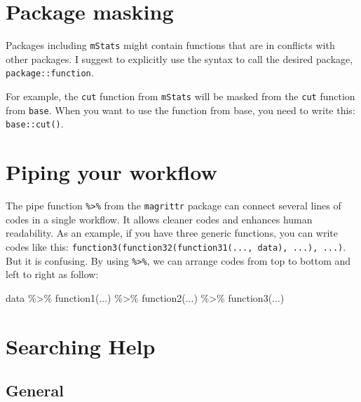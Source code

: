 \documentclass[
]{book}
\newenvironment{Shaded}{\begin{snugshade}}{\end{snugshade}}
\newcommand{\FunctionTok}[1]{\textcolor[rgb]{0.00,0.00,0.00}{#1}}
\newcommand{\NormalTok}[1]{#1}
\newcommand{\SpecialCharTok}[1]{\textcolor[rgb]{0.00,0.00,0.00}{#1}}
\begin{document}
\hypertarget{package-masking}{%
\section{Package masking}\label{package-masking}}

Packages including \texttt{mStats} might contain functions that are in conflicts with other packages. I suggest to explicitly use the syntax to call the desired package, \texttt{package::function}.

For example, the \texttt{cut} function from \texttt{mStats} will be masked from the \texttt{cut} function from \texttt{base}. When you want to use the function from base, you need to write this: \texttt{base::cut()}.

\hypertarget{piping-your-workflow}{%
\section{Piping your workflow}\label{piping-your-workflow}}

The pipe function \texttt{\%\textgreater{}\%} from the \texttt{magrittr} package can connect several lines of codes in a single workflow. It allows cleaner codes and enhances human readability. As an example, if you have three generic functions, you can write codes like this: \texttt{function3(function32(function31(...,\ data),\ ...),\ ...)}. But it is confusing. By using \texttt{\%\textgreater{}\%}, we can arrange codes from top to bottom and left to right as follow:

\begin{Shaded}
\begin{Highlighting}[]
\NormalTok{data }\SpecialCharTok{\%\textgreater{}\%}
  \FunctionTok{function1}\NormalTok{(...) }\SpecialCharTok{\%\textgreater{}\%} 
  \FunctionTok{function2}\NormalTok{(...) }\SpecialCharTok{\%\textgreater{}\%} 
  \FunctionTok{function3}\NormalTok{(...)}
\end{Highlighting}
\end{Shaded}

\hypertarget{searching-help}{%
\section{Searching Help}\label{searching-help}}

\hypertarget{general}{%
\subsection{General}\label{general}}
\end{document}
